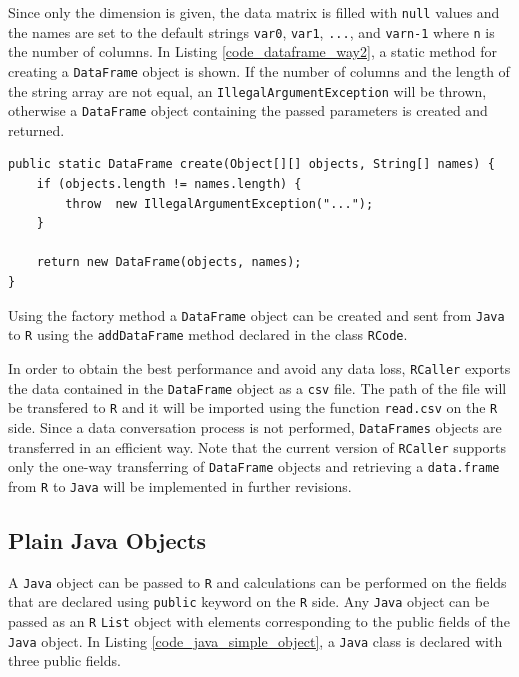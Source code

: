 \documentclass[10pt,a4paper, final, oneside]{article}
\begin{document}
Since only the dimension is given, the data matrix is filled with \texttt{null} values and the names are set to the default strings \texttt{var0}, \texttt{var1}, \texttt{...}, and \texttt{varn-1} where \texttt{n} is the number of columns. In Listing \ref{code_dataframe_way2}, a static method for creating a \texttt{DataFrame} object is shown. If the number of columns and the length of the string array are not equal, an \texttt{IllegalArgumentException} will be thrown, otherwise a \texttt{DataFrame} object containing the passed parameters is created and returned.


\begin{minipage}{\linewidth}
\begin{lstlisting}[caption=Custom DataFrame Creator, label=code_dataframe_way2]
public static DataFrame create(Object[][] objects, String[] names) {
    if (objects.length != names.length) {
        throw  new IllegalArgumentException("...");
    }

    return new DataFrame(objects, names);
}
\end{lstlisting}
\end{minipage}

Using the factory method a \texttt{DataFrame} object can be created and sent from \texttt{Java} to \texttt{R} using the \texttt{addDataFrame} method declared in the class \texttt{RCode}. 

In order to obtain the best performance and avoid any data loss, \texttt{RCaller} exports the data contained in the \texttt{DataFrame} object as a \texttt{csv} file. The path of the file will be transfered to \texttt{R} and it will be imported using the function \texttt{read.csv} on the \texttt{R} side. 
Since a data conversation process is not performed, \texttt{DataFrames} objects are transferred in an efficient way. 
Note that the current version of \texttt{RCaller} supports only the one-way transferring of \texttt{DataFrame} objects and retrieving a \texttt{data.frame} from \texttt{R} to \texttt{Java} will be implemented in further revisions. 


\subsection{Plain Java Objects}
\label{sec:passing_pojos}
A \texttt{Java} object can be passed to \texttt{R} and calculations can be performed on the fields that are declared using \texttt{public} keyword on the \texttt{R} side. Any \texttt{Java} object can be passed as an \texttt{R} \texttt{List} object with elements corresponding to the public fields of the \texttt{Java} object. In Listing \ref{code_java_simple_object}, a \texttt{Java} class is declared with three public fields. 
\end{document}
